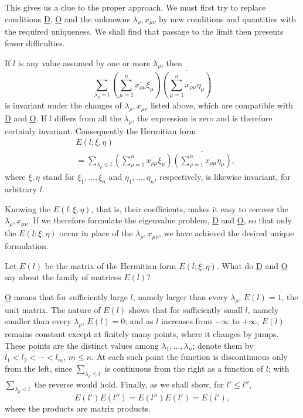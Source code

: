 \documentclass[fontsize=13pt,twoside,openany,headings=normal,parskip=false,bookmarkpackage=false,DIV=calc]{scrbook}
\begin{document}
This gives us a clue to the proper approach. We must first try to replace conditions \hyperref[eq:II.7.D]{D}, \hyperref[eq:II.7.O]{O} and the unknowns $\lambda_\rho,x_{\mu\nu}$ by new conditions and quantities with the required uniqueness. We shall find that passage to the limit then presents fewer difficulties.

If $l$ is any value assumed by one or more $\lambda_\rho$, then
\[
\sum_{\lambda_\rho=l}
\left(\sum_{\mu=1}^n\overline{x_{\rho\mu}}\xi_\mu\right)
\overline{\left(\sum_{\mu=1}^n\overline{x_{\rho\mu}}\eta_\mu\right)}
\]
is invariant under the changes of $\lambda_\rho,x_{\mu\nu}$ listed above, which are compatible with \hyperref[eq:II.7.D]{D} and \hyperref[eq:II.7.O]{O}. If $l$ differs from all the $\lambda_\rho$, the expression is zero and is therefore certainly invariant. Consequently the Hermitian form
\begin{align*}
&E(l;\xi,\eta)\\
&=\sum_{\lambda_\rho\leq l}
\left(\sum_{\rho=1}^n\overline{x_{\rho\mu}}\xi_\mu\right)
\overline{\left(\sum_{\rho=1}^n\overline{x_{\rho\mu}}\eta_\mu\right)},
\end{align*}
where $\xi,\eta$ stand for $\xi_1,\ldots,\xi_n$ and $\eta_1,\ldots,\eta_n$, respectively, is likewise invariant, for arbitrary $l$.

\hypertarget{origpage-58}{}%
Knowing the $E(l;\xi,\eta)$, that is, their coefficients, makes it easy to recover the $\lambda_\rho,x_{\mu\nu}$. If we therefore formulate the eigenvalue problem, \hyperref[eq:II.7.D]{D} and \hyperref[eq:II.7.O]{O}, so that only the $E(l;\xi,\eta)$ occur in place of the $\lambda_\rho,x_{\mu\nu}$, we have achieved the desired unique formulation.

Let $E(l)$ be the matrix of the Hermitian form $E(l;\xi,\eta)$. What do \hyperref[eq:II.7.D]{D} and \hyperref[eq:II.7.O]{O} say about the family of matrices $E(l)$?

\hyperref[eq:II.7.O]{O} means that for sufficiently large $l$, namely larger than every $\lambda_\rho$, $E(l)=1$, the unit matrix. The nature of $E(l)$ shows that for sufficiently small $l$, namely smaller than every $\lambda_\rho$, $E(l)=0$; and as $l$ increases from $-\infty$ to $+\infty$, $E(l)$ remains constant except at finitely many points, where it changes by jumps. These points are the distinct values among $\lambda_1,\ldots,\lambda_n$; denote them by $l_1<l_2<\cdots<l_m$, $m\leq n$. At each such point the function is discontinuous only from the left, since $\sum_{\lambda_\rho\leq l}$ is continuous from the right as a function of $l$; with $\sum_{\lambda_\rho<l}$ the reverse would hold. Finally, as we shall show, for $l'\leq l''$,
\[
E(l')E(l'')=E(l'')E(l')=E(l'),
\]
where the products are matrix products.
\end{document}
